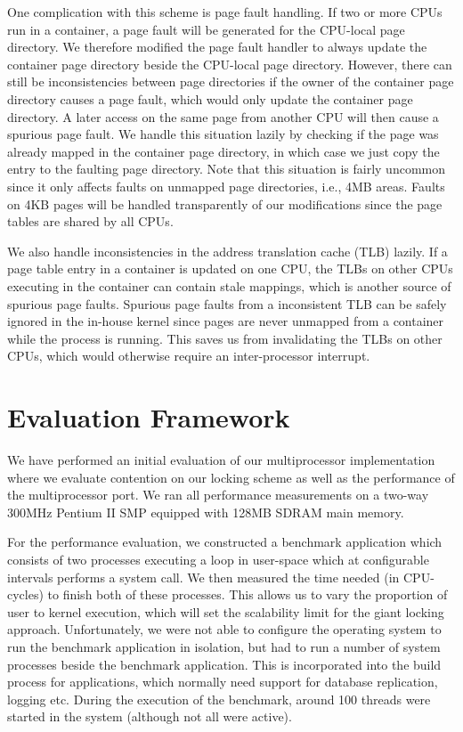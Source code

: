 One complication with this scheme is page fault handling. If two or more CPUs
run in a container, a page fault will be generated for the CPU-local page
directory. We therefore modified the page fault handler to always update the
container page directory beside the CPU-local page directory.  However, there
can still be inconsistencies between page directories if the owner of the
container page directory causes a page fault, which would only update the
container page directory. A later access on the same page from another CPU
will then cause a spurious page fault. We handle this situation lazily by
checking if the page was already mapped in the container page directory, in
which case we just copy the entry to the faulting page directory. Note that
this situation is fairly uncommon since it only affects faults on unmapped
page directories, i.e., 4MB areas. Faults on 4KB pages will be handled
transparently of our modifications since the page tables are shared by all
CPUs.

We also handle inconsistencies in the address translation cache (TLB) lazily.
If a page table entry in a container is updated on one CPU, the TLBs on other
CPUs executing in the container can contain stale mappings, which is another
source of spurious page faults.  Spurious page faults from a inconsistent TLB
can be safely ignored in the in-house kernel since pages are never unmapped
from a container while the process is running. This saves us from invalidating
the TLBs on other CPUs, which would otherwise require an inter-processor
interrupt.

\section{Evaluation Framework}
\label{sec:exp_framework}
We have performed an initial evaluation of our multiprocessor implementation
where we evaluate contention on our locking scheme as well as the performance
of the multiprocessor port. We ran all performance measurements on a two-way
300MHz Pentium II SMP equipped with 128MB SDRAM main memory.

For the performance evaluation, we constructed a benchmark application which
consists of two processes executing a loop in user-space which at configurable
intervals performs a system call. We then measured the time needed (in
CPU-cycles) to finish both of these processes. This allows us to vary the
proportion of user to kernel execution, which will set the scalability limit
for the giant locking approach. Unfortunately, we were not able to configure
the operating system to run the benchmark application in isolation, but had to
run a number of system processes beside the benchmark application. This is
incorporated into the build process for applications, which normally need
support for database replication, logging etc. During the execution of the
benchmark, around 100 threads were started in the system (although not all
were active).

